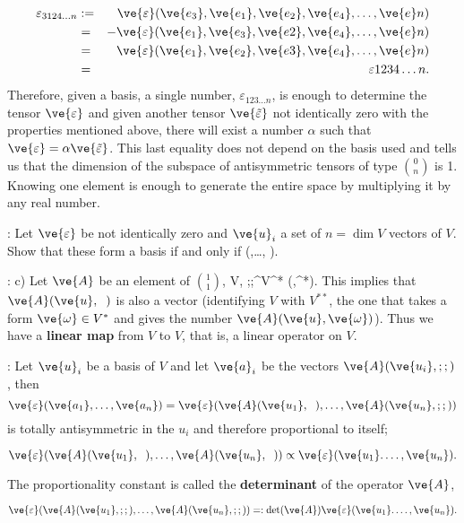 \begin{eqnarray*} 
\varepsilon_{3124\ldots n} &:=& \ve{\varepsilon}(\ve{e_3},\ve{e_1}, \ve{e_{2}}, \ve{e_{4}},\ldots,\ve{e}n) \\
&=& -\ve{\varepsilon}(\ve{e_1},\ve{e_3}, \ve{e{2}}, \ve{e_{4}},\ldots,\ve{e}n) \\ 
&=& \ve{\varepsilon}(\ve{e_1},\ve{e_2}, \ve{e{3}}, \ve{e_{4}},\ldots,\ve{e}n) \\
&=&\varepsilon{1234\ldots n}. 
\end{eqnarray*} 
% 
Therefore, given a basis, a single number, $\varepsilon_{123\ldots n}$, is enough to determine the tensor $\ve{\varepsilon}$ and given another tensor $\ve{\tilde{\varepsilon} }$ not identically zero with the properties mentioned above, there will exist a number $\alpha$ such that $\ve{\varepsilon} = \alpha\ve{\tilde{\varepsilon}}$. This last equality does not depend on the basis used and tells us that the dimension of the subspace of antisymmetric tensors of type ${0 \choose n}$ is 1. Knowing one element is enough to generate the entire space by multiplying it by any real number.

\ejer: Let $\ve{\varepsilon}$ be not identically zero and ${\ve{u}_i}$ a set of $n=\dim V$ vectors of $V$. Show that these form a basis if and only if 
\beq 
\ve{\varepsilon} (,\ldots, ). 
\eeq

\ejem: c) Let $\ve{ A}$ be an element of ${1 \choose 1}$, 
\beq 
{}\in V, ;;^\in V^* \to {}(,^*)\in\re. 
\eeq 
This implies that $\ve{A}(\ve{u},\;\;)$ is also a vector (identifying $V$ with $V^{**}$, the one that takes a form $\ve{\omega} \in V^*$ and gives the number $\ve{A}(\ve{u},\ve{\omega})$). 
Thus we have a \textbf{linear map} from $V$ to $V$, that is, a linear operator on $V$.

\ejer: Let ${\ve{u}_i}$ be a basis of $V$ and let $\ve{ a}_i$ be the vectors $\ve{A}(\ve{u_i},;;)$, then $$ \ve{\varepsilon}(\ve{a_1},\ldots,\ve{a_n})=\ve{\varepsilon}(\ve{A}(\ve{u_1},\;\;),\ldots ,\ve{A}(\ve{u_n},;;)) $$ is totally antisymmetric in the ${u_i}$ and therefore proportional to itself;

\[ 
\ve{\varepsilon}(\ve{A}(\ve{u_1},\;\;),\ldots ,\ve{A}(\ve{u_n},\;\;)) \propto \ve{\varepsilon}(\ve{u_1}. \ldots, \ve{u_n}). 
\] %

The proportionality constant is called the {\bf determinant}  of the operator $\ve{A}$,

\[ 
\ve{\varepsilon}(\ve{A}(\ve{u_1},;;),\ldots ,\ve{A}(\ve{u_n},;;)) =: \det(\ve{A}) \ve{\varepsilon}(\ve{u_1}. \ldots, \ve{u_n}).
\] %

